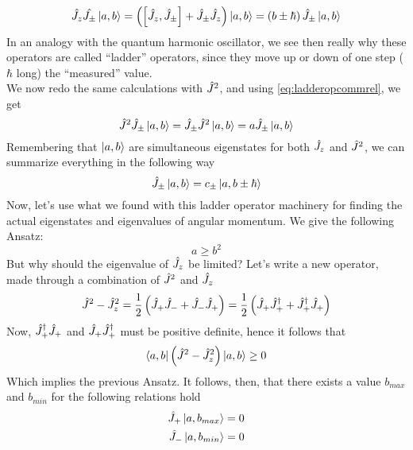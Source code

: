 \documentclass[../qm.tex]{subfiles}
\begin{document}
	\begin{equation*}
		\opr{J_z}\opr{J_{\pm}}\ket{a,b}=\left( \comm{\opr{J}_z}{\opr{J}_{\pm}}+\opr{J}_{\pm}\opr{J}_z \right)\ket{a,b}=\left( b\pm\hbar \right)\opr{J}_{\pm}\ket{a,b}
		\label{eq:ladderaction}
	\end{equation*}
	In an analogy with the quantum harmonic oscillator, we see then really why these operators are called ``ladder'' operators, since they move up or down of one step ($\hbar$ long) the ``measured'' value.\\
	We now redo the same calculations with $\hat{J}^2$, and using \eqref{eq:ladderopcommrel}, we get
	\begin{equation}
		\hat{J}^2\hat{J}_{\pm}\ket{a,b}=\hat{J}_{\pm}\hat{J}^2\ket{a,b}=a\hat{J}_{\pm}\ket{a,b}
		\label{eq:jsqjpmaction}
	\end{equation}
	Remembering that $\ket{a,b}$ are simultaneous eigenstates for both $\hat{J}_z$ and $\hat{J}^2$, we can summarize everything in the following way
	\begin{equation}
		\hat{J}_{\pm}\ket{a,b}=c_{\pm}\ket{a,b\pm\hbar}
		\label{eq:ladderact}
	\end{equation}
	Now, let's use what we found with this ladder operator machinery for finding the actual eigenstates and eigenvalues of angular momentum. We give the following Ansatz:
	\begin{equation*}
		a\ge b^2
	\end{equation*}
	But why should the eigenvalue of $\hat{J}_z$ be limited? Let's write a new operator, made through a combination of $\hat{J}^2$ and $\hat{J}_z$
	\begin{equation}
		\hat{J}^2-\hat{J}_z^2=\frac{1}{2}\left( \hat{J}_+\hat{J}_-+\hat{J}_-\hat{J}_+ \right)=\frac{1}{2}\left( \hat{J}_+\hat{J}^{\dagger}_++\hat{J}^{\dagger}_+\hat{J}_+ \right)
		\label{eq:jsqjzjpmtie}
	\end{equation}
	Now, $\hat{J}^{\dagger}_+\hat{J}_+$ and $\hat{J}_+\hat{J}^{\dagger}_+$ must be positive definite, hence it follows that
	\begin{equation*}
		\bra{a,b}\left( \hat{J}^2-\hat{J}_z^2 \right)\ket{a,b}\ge0
	\end{equation*}
	Which implies the previous Ansatz. It follows, then, that there exists a value $b_{max}$ and $b_{min}$ for the following relations hold
	\begin{equation}
		\begin{aligned}
			\hat{J}_+\ket{a,b_{max}}&=0\\
			\hat{J}_-\ket{a,b_{min}}&=0
		\end{aligned}
		\label{eq:bmaxminangmom}
	\end{equation}
\end{document}
